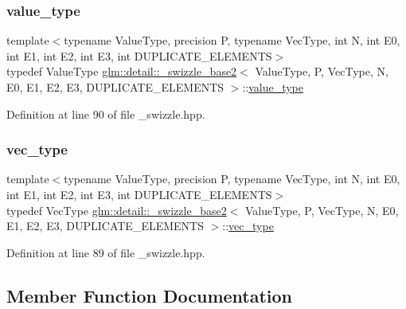 \subsubsection{\texorpdfstring{value\+\_\+type}{value\_type}}
{\footnotesize\ttfamily template$<$typename Value\+Type, precision P, typename Vec\+Type, int N, int E0, int E1, int E2, int E3, int D\+U\+P\+L\+I\+C\+A\+T\+E\+\_\+\+E\+L\+E\+M\+E\+N\+TS$>$ \\
typedef Value\+Type \hyperlink{structglm_1_1detail_1_1__swizzle__base2}{glm\+::detail\+::\+\_\+swizzle\+\_\+base2}$<$ Value\+Type, P, Vec\+Type, N, E0, E1, E2, E3, D\+U\+P\+L\+I\+C\+A\+T\+E\+\_\+\+E\+L\+E\+M\+E\+N\+TS $>$\+::\hyperlink{structglm_1_1detail_1_1__swizzle__base2_a656c11aaeeaca042deed88711c9dc063}{value\+\_\+type}}



Definition at line 90 of file \+\_\+swizzle.\+hpp.

\mbox{\label{structglm_1_1detail_1_1__swizzle__base2_a5f999904e676a4f5b0bdaa157415ee1c}} 
\subsubsection{\texorpdfstring{vec\+\_\+type}{vec\_type}}
{\footnotesize\ttfamily template$<$typename Value\+Type, precision P, typename Vec\+Type, int N, int E0, int E1, int E2, int E3, int D\+U\+P\+L\+I\+C\+A\+T\+E\+\_\+\+E\+L\+E\+M\+E\+N\+TS$>$ \\
typedef Vec\+Type \hyperlink{structglm_1_1detail_1_1__swizzle__base2}{glm\+::detail\+::\+\_\+swizzle\+\_\+base2}$<$ Value\+Type, P, Vec\+Type, N, E0, E1, E2, E3, D\+U\+P\+L\+I\+C\+A\+T\+E\+\_\+\+E\+L\+E\+M\+E\+N\+TS $>$\+::\hyperlink{structglm_1_1detail_1_1__swizzle__base2_a5f999904e676a4f5b0bdaa157415ee1c}{vec\+\_\+type}}



Definition at line 89 of file \+\_\+swizzle.\+hpp.



\subsection{Member Function Documentation}
\mbox{\label{structglm_1_1detail_1_1__swizzle__base2_a11d049274a60ecf4aac8cebc4c4e9be5}} 
